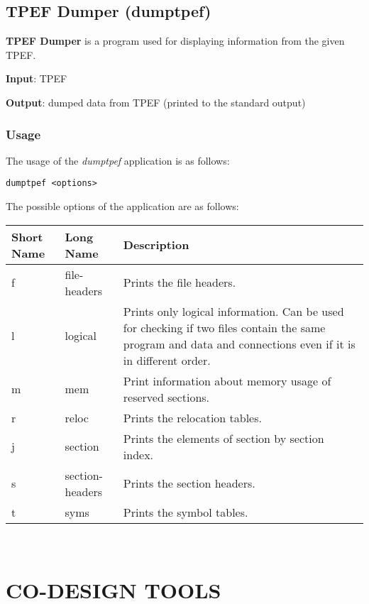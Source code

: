 \documentclass[twoside]{tceusermanual}
\begin{document}
\section{TPEF Dumper (dumptpef)}
\label{section:dumptpef}

\textbf{TPEF Dumper} is a program used for displaying information from the
given TPEF.

\textbf{Input}: TPEF

\textbf{Output}: dumped data from TPEF (printed to the standard output)

\subsection{Usage}

The usage of the \emph{dumptpef} application is as follows:

\begin{verbatim}
dumptpef <options>
\end{verbatim}

The possible options of the application are as follows:\\

\begin{tabular}{p{}p{}
                p{}}
\textbf{Short Name} &\textbf{Long Name} &\textbf{Description} \\
\hline
f & file-headers & Prints the file headers. \\
l & logical & Prints only logical information. Can be used for
checking if two files contain the same program and data and connections even if
it is in different order. \\
m & mem & Print information about memory usage of reserved sections. \\
r & reloc & Prints the relocation tables. \\
j & section & Prints the elements of section by section index. \\
s & section-headers & Prints the section headers. \\
t & syms & Prints the symbol tables. \\
\end{tabular}\\



\chapter{CO-DESIGN TOOLS}
\label{section:codesign}
\end{document}
